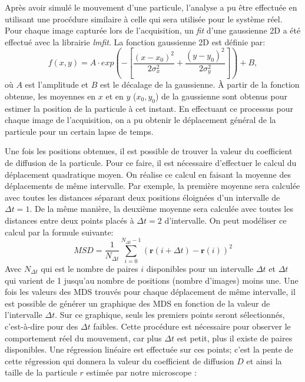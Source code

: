 \documentclass[conference]{IEEEtran}
\begin{document}
Après avoir simulé le mouvement d'une particule, l'analyse a pu être effectuée en utilisant une procédure similaire
à celle qui sera utilisée pour le système réel. Pour chaque image capturée lors de l'acquisition, un \textit{fit}
d'une gaussienne 2D a été effectué avec la librairie \textit{lmfit}. La fonction gaussienne 2D est définie par:
\begin{equation}
  f(x,y)=A\cdot exp\left(-\left[\frac{(x-x_0)^2}{2\sigma_x^2}+\frac{(y-y_0)^2}{2\sigma_y^2}\right]\right)+B,
\end{equation}
où $A$ est l'amplitude et $B$ est le décalage de la gaussienne. À partir de la fonction obtenue, les moyennes en $x$ et en $y$ ($x_0,y_0$) de la gaussienne sont obtenus
pour estimer la position de la particule à cet instant. En effectuant ce processus pour chaque image de l'acquisition,
on a pu obtenir le déplacement général de la particule pour un certain lapse de temps.


Une fois les positions obtenues, il est possible de trouver la valeur du coefficient de diffusion de la particule. 
Pour ce faire, il est nécessaire d'effectuer le calcul du déplacement quadratique moyen. On réalise ce calcul en faisant la moyenne des déplacements de même intervalle. Par exemple, 
la première moyenne sera calculée avec toutes les distances séparant deux positions éloignées d'un intervalle de $\Delta t=1$. De la même manière, la deuxième moyenne sera calculée avec toutes les distances
entre deux points placés à $\Delta t=2$ d'intervalle. On peut modéliser ce calcul par la formule suivante: 
\begin{equation}
  MSD = \frac{1}{N_{\Delta t}} \sum_{i=0}^{N_{\Delta t} - 1} \left( \mathbf{r}(i+\Delta t) - \mathbf{r}(i) \right)^2
\end{equation}
Avec $N_{\Delta t}$ qui est le nombre de paires $i$ disponibles pour un intervalle $\Delta t$ et $\Delta t$ qui varient de 1 jusqu'au nombre de positions (nombre d'images) moins une. 
Une fois les valeurs des MDS trouvés pour chaque déplacement de même intervalle, il est possible de générer un graphique 
des MDS en fonction de la valeur de l'intervalle $\Delta t$. Sur ce graphique, seuls les premiers points seront sélectionnés, c'est-à-dire pour des $\Delta t$ faibles.
Cette procédure est nécessaire pour observer le comportement réel du mouvement, car plus $\Delta t$ est petit, plus il existe de paires disponibles. 
Une régression linéaire est effectuée sur
ces points; c'est la pente de cette régression qui donnera la valeur du coefficient de diffusion $D$ et ainsi la taille de la particule $r$ estimée par notre microscope :
\end{document}
